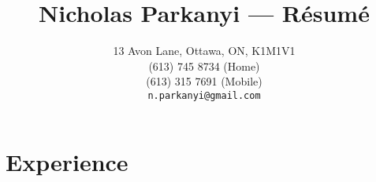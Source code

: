 \documentclass[10pt,letterpaper,notitlepage]{article}
\date{#2}}
\newcommand{\resumetitle}[2]{\title{\vspace{-6ex} #1 --- R\'{e}sum\'{e}\vspace{-3ex}}
  \date{#2}}
\begin{document}
\resumetitle{Nicholas Parkanyi}{13 Avon Lane, Ottawa, ON, K1M1V1 \\
                                (613) 745 8734 (Home) \\ (613) 315 7691 (Mobile) \\
                                \texttt{n.parkanyi@gmail.com}}

\maketitle

\section*{Experience}
\end{document}
